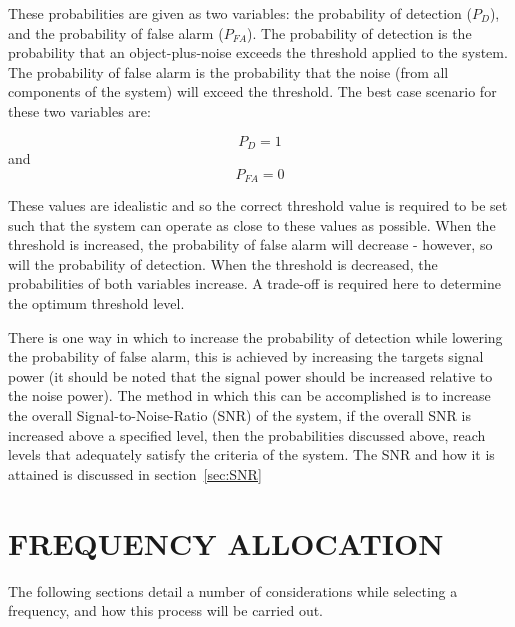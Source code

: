 \documentclass[11pt]{witseiepaper}
\begin{document}
\begin{bibunit}[witseie]
These probabilities are given as two variables: the probability of detection ($P_{D}$), and the probability of false alarm ($P_{FA}$). The probability of detection is the probability that an object-plus-noise exceeds the threshold applied to the system. The probability of false alarm is the probability that the noise (from all components of the system) will exceed the threshold.
The best case scenario for these two variables are: 

\begin{equation} \label{eqn:ProbabilityDetection}
P_{D} = 1
\end{equation} 
and 
\begin{equation} \label{eqn:ProbabilityFalseAlarm}
P_{FA} = 0
\end{equation}

These values are idealistic and so the correct threshold value is required to be set such that the system can operate as close to these values as possible.
When the threshold is increased, the probability of false alarm will decrease - however, so will the probability of detection. When the threshold is decreased, the probabilities of both variables increase. A trade-off is required here to determine the optimum threshold level.

There is one way in which to increase the probability of detection while lowering the probability of false alarm, this is achieved by increasing the targets signal power (it should be noted that the signal power should be increased relative to the noise power). The method in which this can be accomplished is to increase the overall Signal-to-Noise-Ratio (SNR) of the system, if the overall SNR is increased above a specified level, then the probabilities discussed above, reach levels that adequately satisfy the criteria of the system. The SNR and how it is attained is discussed in section~\ref{sec:SNR}


\section{FREQUENCY ALLOCATION} \label{sec:FrequencyAllocation}
The following sections detail a number of considerations while selecting a frequency, and how this process will be carried out.


\end{bibunit}
\end{document}
